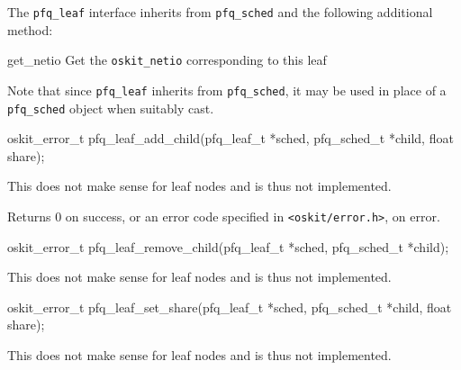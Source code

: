 The \texttt{pfq_leaf} interface inherits from \texttt{pfq_sched} and
the following additional method:
\begin{icsymlist}
	\item[get_netio]
		Get the \texttt{oskit_netio} corresponding to this leaf
\end{icsymlist}

Note that since \texttt{pfq_leaf} inherits from \texttt{pfq_sched},
it may be used in place of a \texttt{pfq_sched} object when suitably cast.

\begin{apisyn}

	\funcproto oskit_error_t pfq_leaf_add_child(pfq_leaf_t *sched,
				pfq_sched_t *child,
				float share);
\end{apisyn}
\begin{apidesc}
	This does not make sense for leaf nodes and is thus not implemented.
\end{apidesc}
\begin{apiret}
	Returns 0 on success, or an error code specified in
	\texttt{<oskit/error.h>}, on error.
\end{apiret}

\begin{apisyn}

	\funcproto oskit_error_t pfq_leaf_remove_child(pfq_leaf_t *sched,
				pfq_sched_t *child);
\end{apisyn}
\begin{apidesc}
	This does not make sense for leaf nodes and is thus not implemented.
\end{apidesc}

\begin{apisyn}

	\funcproto oskit_error_t pfq_leaf_set_share(pfq_leaf_t *sched,
				pfq_sched_t *child,
				float share);
\end{apisyn}
\begin{apidesc}
	This does not make sense for leaf nodes and is thus not implemented.
\end{apidesc}

